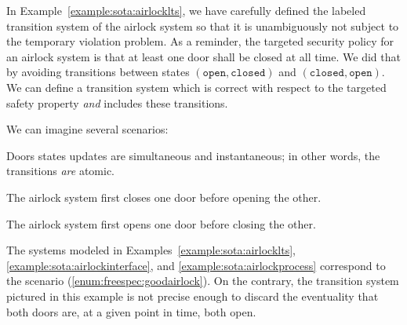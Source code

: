 \begin{example}
  In Example~\ref{example:sota:airlocklts}, we have carefully defined the
  labeled transition system of the airlock system so that it is unambiguously
  not subject to the temporary violation problem.
  As a reminder, the targeted security policy for an airlock system is that at
  least one door shall be closed at all time.
  We did that by avoiding transitions between states
  \( (\mathtt{open}, \mathtt{closed}) \) and
  \( (\mathtt{closed}, \mathtt{open}) \).
  We can define a transition system which is correct with respect to the
  targeted safety property \emph{and} includes these transitions.

  \begin{center}
  \end{center}

  We can imagine several scenarios:
  \begin{inparaenum}[(1)]
  \item Doors states updates are simultaneous and instantaneous; in other words,
    the transitions \emph{are} atomic.
  \item The airlock system first closes one door before opening the
    other. \label{enum:freespec:goodairlock}
  \item The airlock system first opens one door before closing the
    other. \label{enum:freespec:badairlock}
  \end{inparaenum}
  The systems modeled in Examples~\ref{example:sota:airlocklts},
  \ref{example:sota:airlockinterface}, and \ref{example:sota:airlockprocess}
  correspond to the scenario (\ref{enum:freespec:goodairlock}).
  On the contrary, the transition system pictured in this example is not precise
  enough to discard the eventuality that both doors are, at a given point in
  time, both open.
\end{example}

